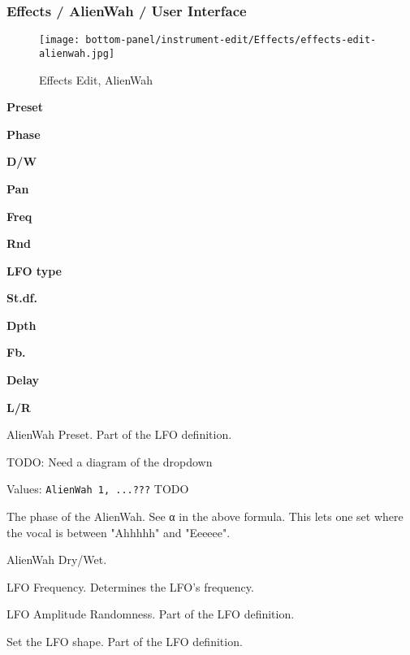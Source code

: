 \subsubsection{Effects / AlienWah / User Interface}
\label{subsubsec:effects_edit_alienwah_ui}

\begin{figure}[H]
   \centering 
   \texttt{[image: bottom-panel/instrument-edit/Effects/effects-edit-alienwah.jpg]}
   \caption{Effects Edit, AlienWah}
   \label{fig:effects_edit_alienwah}
\end{figure}

   \begin{enumber}
      \item \textbf{Preset}
      \item \textbf{Phase}
      \item \textbf{D/W}
      \item \textbf{Pan}
      \item \textbf{Freq}
      \item \textbf{Rnd}
      \item \textbf{LFO type}
      \item \textbf{St.df.}
      \item \textbf{Dpth}
      \item \textbf{Fb.}
      \item \textbf{Delay}
      \item \textbf{L/R}
   \end{enumber}

   \setcounter{ItemCounter}{0}      %

   AlienWah Preset.
   Part of the LFO definition.

   TODO:  Need a diagram of the dropdown

   Values: \texttt{AlienWah 1, ...???} TODO

   The phase of the AlienWah.
   See α in the above formula. This lets one set where the vocal is between
   "Ahhhhh" and "Eeeeee".

   AlienWah Dry/Wet.

   LFO Frequency.
   Determines the LFO’s frequency.

   LFO Amplitude Randomness.
   Part of the LFO definition.

   Set the LFO shape.
   Part of the LFO definition.

